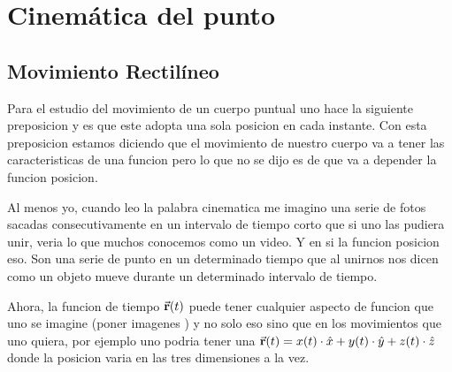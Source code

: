 \documentclass[../Main.tex]{subfiles}
\begin{document}
\chapter{Cinemática del punto}



\section{Movimiento Rectilíneo}
Para el estudio del movimiento de un cuerpo puntual uno hace la siguiente
preposicion y es que este adopta una sola posicion en cada instante. Con esta
preposicion estamos diciendo que el movimiento de nuestro cuerpo va a tener las
caracteristicas de una funcion pero lo que no se dijo es de que va a depender 
la funcion posicion.

Al menos yo, cuando leo la palabra cinematica me imagino una serie de fotos
sacadas consecutivamente en un intervalo de tiempo corto que si uno las pudiera
unir, veria lo que muchos conocemos como un video. Y en si la funcion posicion
eso. Son una serie de punto en un determinado tiempo que al unirnos nos dicen
como un objeto mueve durante un determinado intervalo de tiempo.

Ahora, la funcion de tiempo $\va{r}(t)$ puede tener cualquier aspecto de funcion
que uno se imagine (poner imagenes ) y no solo eso sino que en los movimientos
que uno quiera, por ejemplo uno podria tener una
$\va{r}(t) = x(t) \cdot \hat{x} + y(t) \cdot \hat{y} + z(t) \cdot \hat{z} $
donde la posicion varia en las tres dimensiones a la vez.
\end{document}
